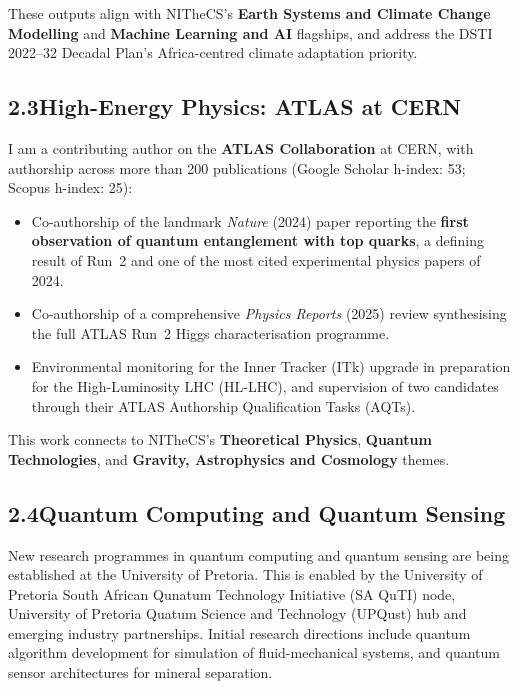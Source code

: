 \documentclass[11pt,a4paper]{article}
\begin{document}
These outputs align with NITheCS's \textbf{Earth Systems and Climate Change Modelling} and \textbf{Machine Learning and AI} flagships, and address the DSTI 2022--32 Decadal Plan's Africa-centred climate adaptation priority.

\subsection{2.3\quad High-Energy Physics: ATLAS at CERN}

I am a contributing author on the \textbf{ATLAS Collaboration} at CERN, with authorship across more than 200 publications (Google Scholar h-index: 53; Scopus h-index: 25):

\begin{itemize}
  \item Co-authorship of the landmark \textit{Nature} (2024) paper reporting the \textbf{first observation of quantum entanglement with top quarks}, a defining result of Run~2 and one of the most cited experimental physics papers of 2024.
  \item Co-authorship of a comprehensive \textit{Physics Reports} (2025) review synthesising the full ATLAS Run~2 Higgs characterisation programme.
  \item Environmental monitoring for the Inner Tracker (ITk) upgrade in preparation for the High-Luminosity LHC (HL-LHC), and supervision of two candidates through their ATLAS Authorship Qualification Tasks (AQTs).
\end{itemize}

This work connects to NITheCS's \textbf{Theoretical Physics}, \textbf{Quantum Technologies}, and \textbf{Gravity, Astrophysics and Cosmology} themes.

\subsection{2.4\quad Quantum Computing and Quantum Sensing}

New research programmes in quantum computing and quantum sensing are being established at the University of Pretoria. This is enabled by the University of Pretoria South African Qunatum Technology Initiative (SA QuTI) node, University of Pretoria Quatum Science and Technology (UPQust) hub and  emerging industry partnerships. Initial research directions include quantum algorithm development for simulation of fluid-mechanical systems, and quantum sensor architectures for mineral separation.

\end{document}
